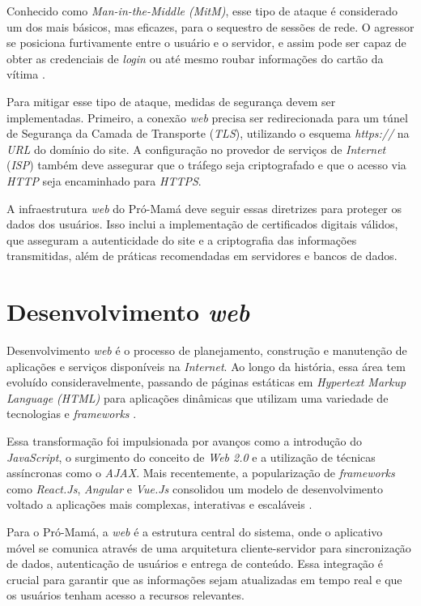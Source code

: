 Conhecido como \emph{Man-in-the-Middle (MitM)}, esse tipo de ataque é considerado um dos mais básicos, mas eficazes, para o sequestro de sessões de rede. O agressor se posiciona furtivamente entre o usuário e o servidor, e assim pode ser capaz de obter as credenciais de \emph{login} ou até mesmo roubar informações do cartão da vítima \cite{mitm}. 

Para mitigar esse tipo de ataque, medidas de segurança devem ser implementadas. Primeiro, a conexão \emph{web} precisa ser redirecionada para um túnel de Segurança da Camada de Transporte (\emph{TLS}), utilizando o esquema \emph{https://} na \emph{URL} do domínio do site. A configuração no provedor de serviços de \emph{Internet} (\emph{ISP}) também deve assegurar que o tráfego seja criptografado e que o acesso via \emph{HTTP} seja encaminhado para \emph{HTTPS}.

A infraestrutura \emph{web} do Pró-Mamá deve seguir essas diretrizes para proteger os dados dos usuários. Isso inclui a implementação de certificados digitais válidos, que asseguram a autenticidade do site e a criptografia das informações transmitidas, além de práticas recomendadas em servidores e bancos de dados.

\section{Desenvolvimento \emph{web}}

Desenvolvimento \emph{web} é o processo de planejamento, construção e manutenção de aplicações e serviços disponíveis na \emph{Internet}. Ao longo da história, essa área tem evoluído consideravelmente, passando de páginas estáticas em \emph{Hypertext Markup Language (HTML)} para aplicações dinâmicas que utilizam uma variedade de tecnologias e \emph{frameworks} \cite{webevolution}.

Essa transformação foi impulsionada por avanços como a introdução do \emph{JavaScript}, o surgimento do conceito de \emph{Web 2.0} e a utilização de técnicas assíncronas como o \emph{AJAX}. Mais recentemente, a popularização de \emph{frameworks} como \emph{React.Js}, \emph{Angular} e \emph{Vue.Js} consolidou um modelo de desenvolvimento voltado a aplicações mais complexas, interativas e escaláveis \cite{webevolution2}.

Para o Pró-Mamá, a \emph{web} é a estrutura central do sistema, onde o aplicativo móvel se comunica através de uma arquitetura cliente-servidor para sincronização de dados, autenticação de usuários e entrega de conteúdo. Essa integração é crucial para garantir que as informações sejam atualizadas em tempo real e que os usuários tenham acesso a recursos relevantes.

